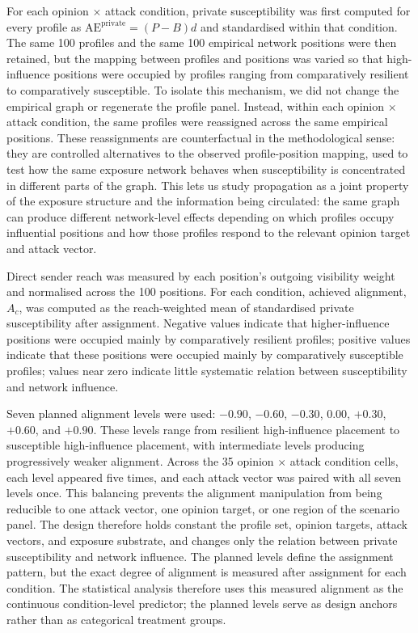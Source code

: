 \documentclass[11pt,a4paper]{article}
\begin{document}
For each opinion $\times$ attack condition, private susceptibility was first computed for every
profile as \(\mathrm{AE}^{\mathrm{private}} = (P-B)d\) and standardised within that condition. The
same 100 profiles and the same 100 empirical network positions were then retained, but the mapping
between profiles and positions was varied so that high-influence positions were occupied by
profiles ranging from comparatively resilient to comparatively susceptible. To isolate this
mechanism, we did not change the empirical graph or regenerate the profile panel. Instead, within
each opinion $\times$ attack condition, the same profiles were reassigned across the same empirical
positions. These reassignments are counterfactual in the methodological sense: they are controlled
alternatives to the observed profile-position mapping, used to test how the same exposure network
behaves when susceptibility is concentrated in different parts of the graph. This lets us study
propagation as a joint property of the exposure structure and the information being circulated:
the same graph can produce different network-level effects depending on which profiles occupy
influential positions and how those profiles respond to the relevant opinion target and attack
vector.

Direct sender reach was measured by each position's outgoing visibility weight and normalised
across the 100 positions. For each condition, achieved alignment, \(A_c\), was computed as the
reach-weighted mean of standardised private susceptibility after assignment. Negative values
indicate that higher-influence positions were occupied mainly by comparatively resilient profiles;
positive values indicate that these positions were occupied mainly by comparatively susceptible
profiles; values near zero indicate little systematic relation between susceptibility and network
influence.

Seven planned alignment levels were used: \(-0.90\), \(-0.60\), \(-0.30\), \(0.00\), \(+0.30\),
\(+0.60\), and \(+0.90\). These levels range from resilient high-influence placement to susceptible
high-influence placement, with intermediate levels producing progressively weaker alignment.
Across the 35 opinion $\times$ attack condition cells, each level appeared five times, and each
attack vector was paired with all seven levels once. This balancing prevents the alignment
manipulation from being reducible to one attack vector, one opinion target, or one region of the
scenario panel. The design therefore holds constant the profile set, opinion targets, attack
vectors, and exposure substrate, and changes only the relation between private susceptibility and
network influence. The planned levels define the assignment pattern, but the exact degree of
alignment is measured after assignment for each condition. The statistical analysis therefore uses
this measured alignment as the continuous condition-level predictor; the planned levels serve as
design anchors rather than as categorical treatment groups.
\end{document}
